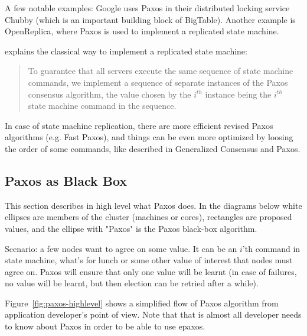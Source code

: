 \documentclass[english,11pt]{l4proj}
\begin{document}
A few notable examples: Google uses Paxos in their distributed locking service
Chubby\cite{chubby} (which is an important building block of BigTable). Another
example is OpenReplica\cite{openreplica}, where Paxos is used to implement a
replicated state machine.

\cite{paxos-simple} explains the classical way to implement a replicated state
machine:

\begin{quote}
To guarantee that all servers execute the same sequence of state machine
commands, we implement a sequence of separate instances of the Paxos consensus
algorithm, the value chosen by the $i^{th}$ instance being the $i^{th}$ state
machine command in the sequence.
\end{quote}

In case of state machine replication, there are more efficient revised Paxos
algorithms (e.g. Fast Paxos\cite{fast-paxos}), and things can be even more
optimized by loosing the order of some commands, like described in Generalized
Consensus and Paxos\cite{generalized-consensus}.

\subsection{Paxos as Black Box}

This section describes in high level what Paxos does. In the diagrams below
white ellipses are members of the cluster (machines or cores), rectangles are
proposed values, and the ellipse with "Paxos" is the Paxos black-box algorithm.

Scenario: a few nodes want to agree on some value. It can be an $i$'th command
in state machine, what's for lunch or some other value of interest that nodes
must agree on. Paxos will ensure that only one value will be learnt (in case of
failures, no value will be learnt, but then election can be retried after a
while).

Figure~\ref{fig:paxos-highlevel} shows a simplified flow of Paxos algorithm from
application developer's point of view. Note that that is almost all developer
needs to know about Paxos in order to be able to use epaxos\cite{epaxos}.
\end{document}

